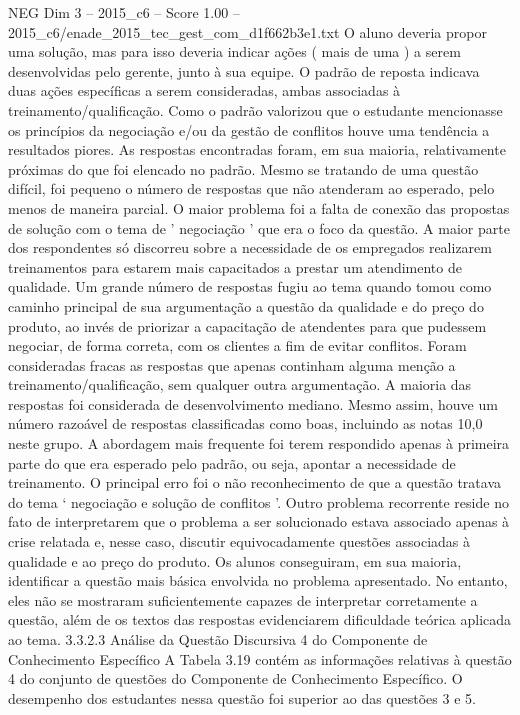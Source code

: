 \begin{textsample}{NEG Dim 3 – 2015\_c6 – Score 1.00 – 2015\_c6/enade\_2015\_tec\_gest\_com\_d1f662b3e1.txt}
O aluno deveria propor uma solução, mas para isso deveria indicar ações ( mais de uma ) a serem desenvolvidas pelo gerente, junto à sua equipe.
O padrão de reposta indicava duas ações específicas a serem consideradas, ambas associadas à treinamento/qualificação.
Como o padrão valorizou que o estudante mencionasse os princípios da negociação e/ou da gestão de conflitos houve uma tendência a resultados piores.
As respostas encontradas foram, em sua maioria, relativamente próximas do que foi elencado no padrão.
Mesmo se tratando de uma questão difícil, foi pequeno o número de respostas que não atenderam ao esperado, pelo menos de maneira parcial.
O maior problema foi a falta de conexão das propostas de solução com o tema de ' negociação ' que era o foco da questão.
A maior parte dos respondentes só discorreu sobre a necessidade de os empregados realizarem treinamentos para estarem mais capacitados a prestar um atendimento de qualidade.
Um grande número de respostas fugiu ao tema quando tomou como caminho principal de sua argumentação a questão da qualidade e do preço do produto, ao invés de priorizar a capacitação de atendentes para que pudessem negociar, de forma correta, com os clientes a fim de evitar conflitos.
Foram consideradas fracas as respostas que apenas continham alguma menção a treinamento/qualificação, sem qualquer outra argumentação.
A maioria das respostas foi considerada de desenvolvimento mediano.
Mesmo assim, houve um número razoável de respostas classificadas como boas, incluindo as notas 10,0 neste grupo.
A abordagem mais frequente foi terem respondido apenas à primeira parte do que era esperado pelo padrão, ou seja, apontar a necessidade de treinamento.
O principal erro foi o não reconhecimento de que a questão tratava do tema ‘ negociação e solução de conflitos ’.
Outro problema recorrente reside no fato de interpretarem que o problema a ser solucionado estava associado apenas à crise relatada e, nesse caso, discutir equivocadamente questões associadas à qualidade e ao preço do produto.
Os alunos conseguiram, em sua maioria, identificar a questão mais básica envolvida no problema apresentado.
No entanto, eles não se mostraram suficientemente capazes de interpretar corretamente a questão, além de os textos das respostas evidenciarem dificuldade teórica aplicada ao tema. 3.3.2.3 Análise da Questão Discursiva 4 do Componente de Conhecimento Específico A Tabela 3.19 contém as informações relativas à questão 4 do conjunto de questões do Componente de Conhecimento Específico.
O desempenho dos estudantes nessa questão foi superior ao das questões 3 e 5.

\end{textsample}
